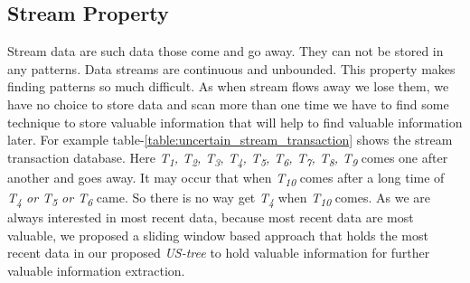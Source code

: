 	\subsection{Stream Property}
	Stream data are such data those come and go away. They can not be stored in any patterns. Data streams are continuous and unbounded. This property makes finding patterns so much difficult. As when stream flows away we lose them, we have no choice to store data and scan more than one time we have to find some technique to store valuable information that will help to find valuable information later. For example table-\ref{table:uncertain_stream_transaction} shows the stream transaction database. Here \emph{T\textsubscript{1}, T\textsubscript{2}, T\textsubscript{3}, T\textsubscript{4}, T\textsubscript{5}, T\textsubscript{6}, T\textsubscript{7}, T\textsubscript{8}, T\textsubscript{9}} comes one after another and goes away. It may occur that when \emph{T\textsubscript{10}} comes after a long time of \emph{T\textsubscript{4} or T\textsubscript{5} or T\textsubscript{6}} came. So there is no way get \emph{T\textsubscript{4}} when \emph{T\textsubscript{10}} comes. As we are always interested in most recent data, because most recent data are most valuable, we proposed a sliding window based approach that holds the most recent data in our proposed \emph{US-tree} to hold valuable information for further valuable information extraction.

